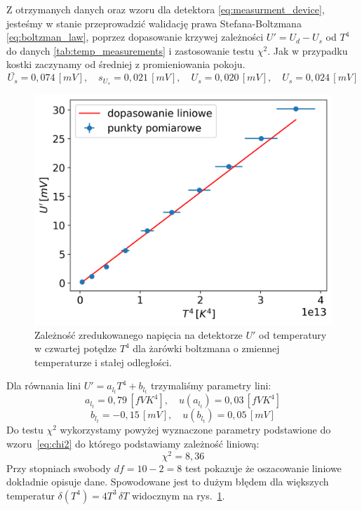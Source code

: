 \documentclass[12pt]{article}
\begin{document}
Z otrzymanych danych oraz wzoru dla detektora \eqref{eq:measurment_device}, jesteśmy w stanie przeprowadzić walidację prawa Stefana-Boltzmana \eqref{eq:boltzman_law}, poprzez dopasowanie krzywej zależności $U' = U_d - U_s$ od $T^4$ do danych \ref{tab:temp_measurements} i zastosowanie testu $\chi^2$.
Jak w przypadku kostki zaczynamy od średniej z promieniowania pokoju.
\[
    \bar{U_s} = 0{,}074 \, [mV], \quad s_{U_s} = 0{,}021 \, [mV], \quad U_s = 0{,}020 \, [mV], \quad U_s = 0{,}024 \, [mV]
\]

\begin{figure}[H]
    \centering
    \includegraphics[scale=0.5]{boltzman_temp}
    \caption{Zależność zredukowanego napięcia na detektorze $U'$ od temperatury w czwartej potędze $T^4$ dla żarówki boltzmana o zmiennej temperaturze i stałej odległości.}
    \label{fig:boltzman_temp}
\end{figure}

Dla równania lini $U' = a_{l_t} T^4 + b_{l_t}$ trzymaliśmy parametry lini:
\[
    a_{l_t} = 0{,}79 \, [fVK^4], \quad u(a_{l_t}) = 0{,}03 \, [fVK^4]
\]
\[
    b_{l_t} = -0{,}15 \, [mV], \quad u(b_{l_t}) = 0{,}05 \, [mV]
\]
Do testu $\chi^2$ wykorzystamy powyżej wyznaczone parametry podstawione do wzoru~\eqref{eq:chi2} do którego podstawiamy zależność liniową:
\[
    \chi^2 = 8{,}36 
\]
Przy stopniach swobody $df = 10 - 2 =8$ test pokazuje że oszacowanie liniowe dokładnie opisuje dane. Spowodowane jest to dużym błędem dla większych temperatur $\delta (T^4) = 4T^3 \, \delta T$ widocznym na rys.~\ref{fig:boltzman_temp}.
\end{document}
